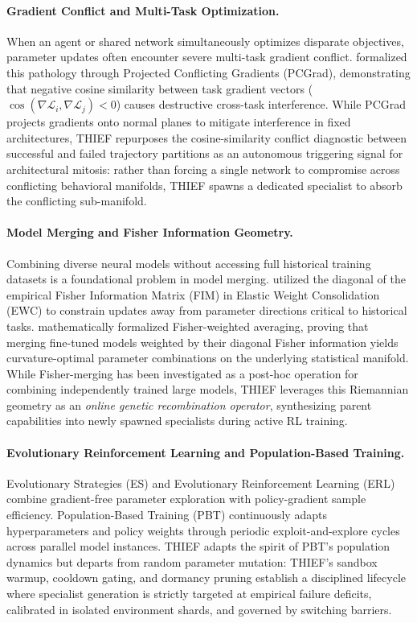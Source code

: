 \paragraph{Gradient Conflict and Multi-Task Optimization.}
When an agent or shared network simultaneously optimizes disparate objectives, parameter updates often encounter severe multi-task gradient conflict. \citet{yu2020gradient} formalized this pathology through Projected Conflicting Gradients (PCGrad), demonstrating that negative cosine similarity between task gradient vectors ($\cos(\nabla \mathcal{L}_i, \nabla \mathcal{L}_j) < 0$) causes destructive cross-task interference. While PCGrad projects gradients onto normal planes to mitigate interference in fixed architectures, THIEF repurposes the cosine-similarity conflict diagnostic between successful and failed trajectory partitions as an autonomous triggering signal for architectural mitosis: rather than forcing a single network to compromise across conflicting behavioral manifolds, THIEF spawns a dedicated specialist to absorb the conflicting sub-manifold.

\paragraph{Model Merging and Fisher Information Geometry.}
Combining diverse neural models without accessing full historical training datasets is a foundational problem in model merging. \citet{kirkpatrick2017overcoming} utilized the diagonal of the empirical Fisher Information Matrix (FIM) in Elastic Weight Consolidation (EWC) to constrain updates away from parameter directions critical to historical tasks. \citet{matena2021merging} mathematically formalized Fisher-weighted averaging, proving that merging fine-tuned models weighted by their diagonal Fisher information yields curvature-optimal parameter combinations on the underlying statistical manifold. While Fisher-merging has been investigated as a post-hoc operation for combining independently trained large models, THIEF leverages this Riemannian geometry as an \emph{online genetic recombination operator}, synthesizing parent capabilities into newly spawned specialists during active RL training.

\paragraph{Evolutionary Reinforcement Learning and Population-Based Training.}
Evolutionary Strategies (ES) \citep{salimans2017evolution,stanley2019open} and Evolutionary Reinforcement Learning (ERL) \citep{khadka2018evolution} combine gradient-free parameter exploration with policy-gradient sample efficiency. Population-Based Training (PBT) \citep{jaderberg2017population} continuously adapts hyperparameters and policy weights through periodic exploit-and-explore cycles across parallel model instances. THIEF adapts the spirit of PBT's population dynamics but departs from random parameter mutation: THIEF's sandbox warmup, cooldown gating, and dormancy pruning establish a disciplined lifecycle where specialist generation is strictly targeted at empirical failure deficits, calibrated in isolated environment shards, and governed by switching barriers.
